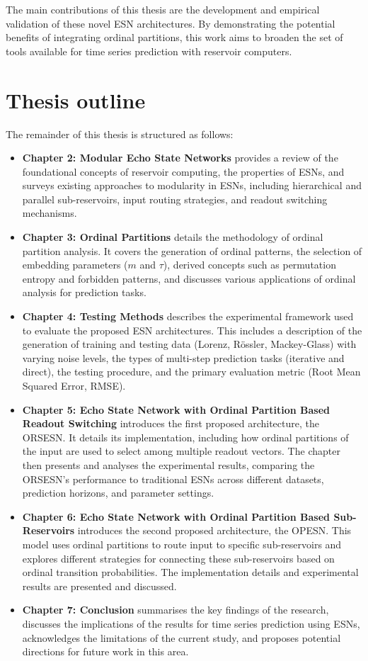 The main contributions of this thesis are the development and empirical validation of these novel ESN architectures. By demonstrating the potential benefits of integrating ordinal partitions, this work aims to broaden the set of tools available for time series prediction with reservoir computers.

\section{Thesis outline}
\label{sec:thesis_outline}

The remainder of this thesis is structured as follows:

\begin{itemize}
    \item \textbf{Chapter 2: Modular Echo State Networks} provides a review of the foundational concepts of reservoir computing, the properties of ESNs, and surveys existing approaches to modularity in ESNs, including hierarchical and parallel sub-reservoirs, input routing strategies, and readout switching mechanisms.
    \item \textbf{Chapter 3: Ordinal Partitions} details the methodology of ordinal partition analysis. It covers the generation of ordinal patterns, the selection of embedding parameters ($m$ and $\tau$), derived concepts such as permutation entropy and forbidden patterns, and discusses various applications of ordinal analysis for prediction tasks.
    \item \textbf{Chapter 4: Testing Methods} describes the experimental framework used to evaluate the proposed ESN architectures. This includes a description of the generation of training and testing data (Lorenz, Rössler, Mackey-Glass) with varying noise levels, the types of multi-step prediction tasks (iterative and direct), the testing procedure, and the primary evaluation metric (Root Mean Squared Error, RMSE).
    \item \textbf{Chapter 5: Echo State Network with Ordinal Partition Based Readout Switching} introduces the first proposed architecture, the ORSESN. It details its implementation, including how ordinal partitions of the input are used to select among multiple readout vectors. The chapter then presents and analyses the experimental results, comparing the ORSESN's performance to traditional ESNs across different datasets, prediction horizons, and parameter settings.
    \item \textbf{Chapter 6: Echo State Network with Ordinal Partition Based Sub-Reservoirs} introduces the second proposed architecture, the OPESN. This model uses ordinal partitions to route input to specific sub-reservoirs and explores different strategies for connecting these sub-reservoirs based on ordinal transition probabilities. The implementation details and experimental results are presented and discussed.
    \item \textbf{Chapter 7: Conclusion} summarises the key findings of the research, discusses the implications of the results for time series prediction using ESNs, acknowledges the limitations of the current study, and proposes potential directions for future work in this area.
\end{itemize}





